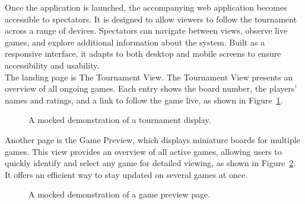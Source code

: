 Once the application is launched, the accompanying web application becomes accessible to spectators. It is designed to allow viewers to follow the tournament across a range of devices. Spectators can navigate between views, observe live games, and explore additional information about the system. Built as a responsive interface, it adapts to both desktop and mobile screens to ensure accessibility and usability. \\

The landing page is The Tournament View. The Tournament View presents an overview of all ongoing games. Each entry shows the board number, the players' names and ratings, and a link to follow the game live, as shown in Figure~\ref{fig:tournament-view-mocked}. \\

\begin{figure}[h!] \centering {}\caption[Display of tournament]{A mocked demonstration of a tournament display.}\label{fig:tournament-view-mocked} \end{figure}

Another page is the Game Preview, which displays miniature boards for multiple games. This view provides an overview of all active games, allowing users to quickly identify and select any game for detailed viewing, as shown in Figure~\ref{fig:game-preview}. It offers an efficient way to stay updated on several games at once. \\

\begin{figure}[h!] \centering {}\caption[Preview of active games]{A mocked demonstration of a game preview page.}\label{fig:game-preview} \end{figure}

